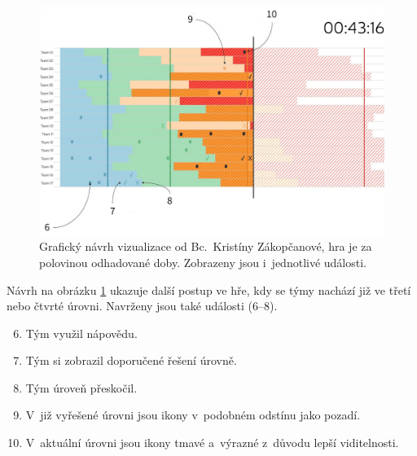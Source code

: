 \documentclass[
  digital, %
  oneside, %
  table,   %
  nolof,     %
  nolot,     %
]{fithesis3}
\begin{document}
\begin{figure}[H]
  \begin{center}
    \includegraphics[width=12.7cm]{images/navrh-vizualizace-2-4.png}
  \end{center}
  \caption{Grafický návrh vizualizace od Bc.~Kristíny Zákopčanové, hra je za polovinou odhadované doby. Zobrazeny jsou i~jednotlivé události.}
  \label{fig:progress2}
\end{figure}
Návrh na obrázku \ref{fig:progress2} ukazuje další postup ve hře, kdy se týmy nachází již ve třetí nebo čtvrté úrovni. Navrženy jsou také události (6–8).
\begin{enumerate}
  \setcounter{enumi}{5}
  \item Tým využil nápovědu.
  \item Tým si zobrazil doporučené řešení úrovně.
  \item Tým úroveň přeskočil.
  \item V~již vyřešené úrovni jsou ikony v~podobném odstínu jako pozadí.
  \item V~aktuální úrovni jsou ikony tmavé a~výrazné z~důvodu lepší viditelnosti.
\end{enumerate}
\end{document}

